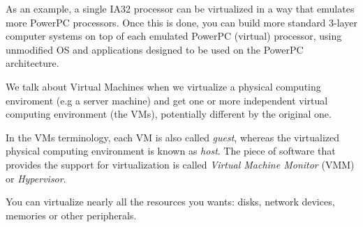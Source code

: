 As an example, a single IA32 processor can be virtualized in a way that emulates more PowerPC processors. Once this is done, you
can build more standard 3-layer computer systems on top of each emulated PowerPC (virtual) processor, using unmodified OS and 
applications designed to be used on the PowerPC architecture.

We talk about Virtual Machines when we virtualize a physical computing enviroment (e.g a server machine) and get one or more 
independent virtual computing environment (the VMs), potentially different by the original one.

In the VMs terminology, each VM is also called \emph{guest}, whereas the virtualized physical computing environment is known as
\emph{host}.
The piece of software that provides the support for virtualization is called \emph{Virtual Machine Monitor} (VMM) or \emph{Hypervisor}.

You can virtualize nearly all the resources you wants: disks, network devices, memories or other peripherals.

\vspace{0.5cm}

